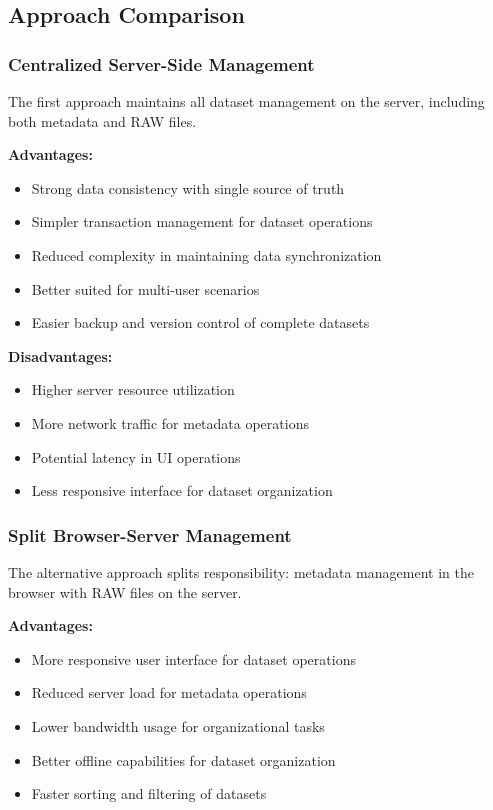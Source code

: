 \subsection{Approach Comparison}

\subsubsection{Centralized Server-Side Management}
The first approach maintains all dataset management on the server, including both metadata and RAW files.

\textbf{Advantages:}
\begin{itemize}
    \item Strong data consistency with single source of truth
    \item Simpler transaction management for dataset operations
    \item Reduced complexity in maintaining data synchronization
    \item Better suited for multi-user scenarios
    \item Easier backup and version control of complete datasets
\end{itemize}

\textbf{Disadvantages:}
\begin{itemize}
    \item Higher server resource utilization
    \item More network traffic for metadata operations
    \item Potential latency in UI operations
    \item Less responsive interface for dataset organization
\end{itemize}

\subsubsection{Split Browser-Server Management}
The alternative approach splits responsibility: metadata management in the browser with RAW files on the server.

\textbf{Advantages:}
\begin{itemize}
    \item More responsive user interface for dataset operations
    \item Reduced server load for metadata operations
    \item Lower bandwidth usage for organizational tasks
    \item Better offline capabilities for dataset organization
    \item Faster sorting and filtering of datasets
\end{itemize}

